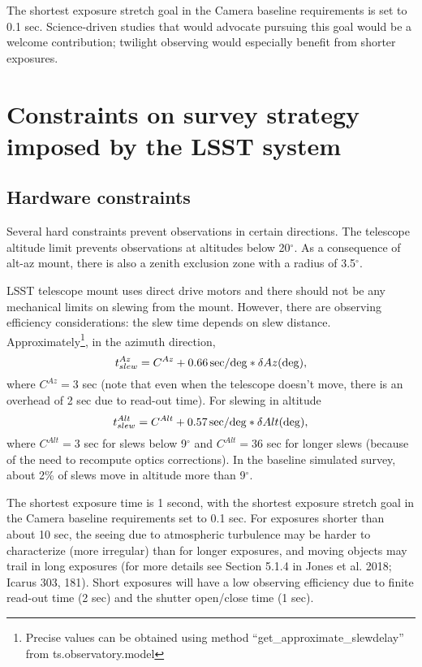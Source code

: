 \documentclass[DM,lsstdraft,toc,usenatbib]{lsstdoc}
\begin{document}
The shortest exposure stretch goal in the Camera baseline requirements is set to 0.1 sec. Science-driven
studies that would advocate pursuing this goal would be a welcome contribution; twilight observing
would especially benefit from shorter exposures. 
 

\section{Constraints on survey strategy imposed by the LSST system} 

\subsection{Hardware constraints}

Several hard constraints prevent observations in certain directions. The telescope altitude limit
prevents observations at altitudes below 20$^\circ$.  As a consequence of alt-az mount, there
is also a zenith exclusion zone with a radius of 3.5$^\circ$. 

LSST telescope mount uses direct drive motors and there should not be any mechanical limits 
on slewing from the mount.  However, there are observing efficiency considerations: the slew time 
depends on slew distance. Approximately\footnote{Precise values can be obtained using
method ``get\_approximate\_slewdelay'' from ts.observatory.model}, in the azimuth direction, 
\begin{equation}
             t_{slew}^{Az} = C^{Az} + 0.66 \, {\rm sec/deg} * \delta Az ({\rm deg}),  
\end{equation} 
where $C^{Az} = 3$ sec (note that even when the telescope doesn't move, there is an overhead
of 2 sec due to read-out time). For slewing in altitude
\begin{equation}
             t_{slew}^{Alt} = C^{Alt} + 0.57 \, {\rm sec/deg} * \delta Alt ({\rm deg}),  
\end{equation} 
where $C^{Alt} = 3$ sec for slews below 9$^\circ$ and $C^{Alt} = 36$ sec for longer slews (because 
of the need to recompute optics corrections). In the baseline simulated survey, about 2\% of slews move
in altitude more than 9$^\circ$. 

The shortest exposure time is 1 second, with the shortest exposure stretch goal in the Camera 
baseline requirements set to 0.1 sec. For exposures shorter than 
about 10 sec, the seeing due to atmospheric turbulence may be harder to characterize (more
irregular) than for longer exposures, and moving objects may trail in long exposures (for more
details see Section 5.1.4 in Jones et al. 2018; Icarus 303, 181). Short exposures will have a low
observing efficiency due to finite read-out time (2 sec) and the shutter open/close time (1 sec). 
\end{document}
